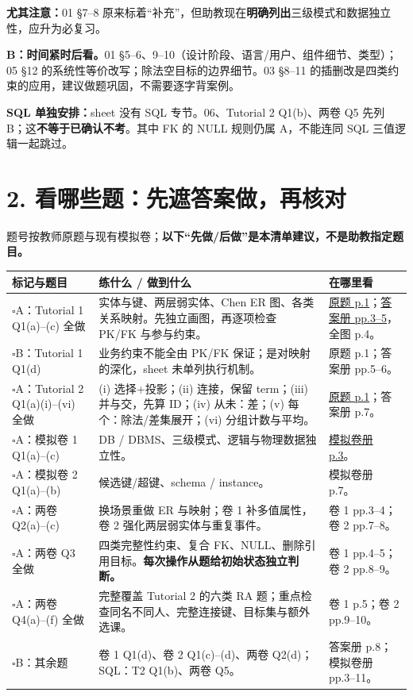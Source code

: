\documentclass[11pt,a4paper]{article}
\newcommand{\ck}{\(\square\)\;}
\begin{document}
\textbf{尤其注意：}01 §7--8 原来标着“补充”，但助教现在\textbf{明确列出}三级模式和数据独立性，应升为必复习。

\textbf{B：时间紧时后看。}01 §5--6、9--10（设计阶段、语言/用户、组件细节、类型）；05 §12 的系统性等价改写；除法空目标的边界细节。03 §8--11 的插删改是四类约束的应用，建议做题巩固，不需要逐字背案例。

\textbf{SQL 单独安排：}sheet 没有 SQL 专节。06、Tutorial 2 Q1(b)、两卷 Q5 先列 B；这\textbf{不等于已确认不考}。其中 FK 的 NULL 规则仍属 A，不能连同 SQL 三值逻辑一起跳过。

\clearpage
\section{2. 看哪些题：先遮答案做，再核对}
题号按教师原题与现有模拟卷；\textbf{以下“先做/后做”是本清单建议，不是助教指定题目。}

{\small\begin{longtable}{@{}p{.26\linewidth}p{.43\linewidth}p{.23\linewidth}@{}}
\toprule 标记与题目 & 练什么 / 做到什么 & 在哪里看 \\
\midrule\endhead
\ck A：Tutorial 1 Q1(a)--(c) 全做 & 实体与键、两层弱实体、Chen ER 图、各类关系映射。先独立画图，再逐项检查 PK/FK 与参与约束。 & \href{../../../slides/Tutorial1.pdf}{原题 p.1}；\href{tutorial_answers.pdf}{答案册 pp.3--5}，全图 p.4。\\
\ck B：Tutorial 1 Q1(d) & 业务约束不能全由 PK/FK 保证；是对映射的深化，sheet 未单列执行机制。 & 原题 p.1；答案册 pp.5--6。\\
\ck A：Tutorial 2 Q1(a)(i)--(vi) 全做 & (i) 选择+投影；(ii) 连接，保留 term；(iii) 并与交，先算 ID；(iv) 从未：差；(v) 每个：除法/差集展开；(vi) 分组计数与平均。 & \href{../../../slides/Tutorial 2.pdf}{原题 p.1}；答案册 p.7。\\
\ck A：模拟卷 1 Q1(a)--(c) & DB / DBMS、三级模式、逻辑与物理数据独立性。 & \href{practice_papers.pdf}{模拟卷册 p.3}。\\
\ck A：模拟卷 2 Q1(a)--(b) & 候选键/超键、schema / instance。 & 模拟卷册 p.7。\\
\ck A：两卷 Q2(a)--(c) & 换场景重做 ER 与映射；卷 1 补多值属性，卷 2 强化两层弱实体与重复事件。 & 卷 1 pp.3--4；卷 2 pp.7--8。\\
\ck A：两卷 Q3 全做 & 四类完整性约束、复合 FK、NULL、删除引用目标。\textbf{每次操作从题给初始状态独立判断。} & 卷 1 pp.4--5；卷 2 pp.8--9。\\
\ck A：两卷 Q4(a)--(f) 全做 & 完整覆盖 Tutorial 2 的六类 RA 题；重点检查同名不同人、完整连接键、目标集与额外选课。 & 卷 1 p.5；卷 2 pp.9--10。\\
\ck B：其余题 & 卷 1 Q1(d)、卷 2 Q1(c)--(d)、两卷 Q2(d)；SQL：T2 Q1(b)、两卷 Q5。 & 答案册 p.8；模拟卷册 pp.3--11。\\
\bottomrule
\end{longtable}}
\end{document}

